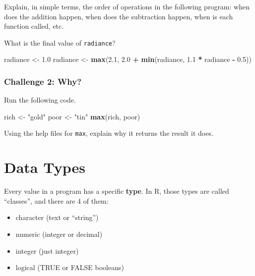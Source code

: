 \documentclass[]{book}
\newenvironment{Shaded}{\begin{snugshade}}{\end{snugshade}}
\newcommand{\FloatTok}[1]{\textcolor[rgb]{0.00,0.00,0.81}{#1}}
\newcommand{\KeywordTok}[1]{\textcolor[rgb]{0.13,0.29,0.53}{\textbf{#1}}}
\newcommand{\NormalTok}[1]{#1}
\newcommand{\OperatorTok}[1]{\textcolor[rgb]{0.81,0.36,0.00}{\textbf{#1}}}
\newcommand{\StringTok}[1]{\textcolor[rgb]{0.31,0.60,0.02}{#1}}
\providecommand{\tightlist}{%
  \setlength{\itemsep}{0pt}\setlength{\parskip}{0pt}}
\begin{document}
Explain, in simple terms, the order of operations in the following program: when does the addition happen, when does the subtraction happen, when is each function called, etc.

What is the final value of \texttt{radiance}?

\begin{Shaded}
\begin{Highlighting}[]
\NormalTok{radiance <-}\StringTok{ }\FloatTok{1.0}
\NormalTok{radiance <-}\StringTok{ }\KeywordTok{max}\NormalTok{(}\FloatTok{2.1}\NormalTok{, }\FloatTok{2.0} \OperatorTok{+}\StringTok{ }\KeywordTok{min}\NormalTok{(radiance, }\FloatTok{1.1} \OperatorTok{*}\StringTok{ }\NormalTok{radiance }\OperatorTok{-}\StringTok{ }\FloatTok{0.5}\NormalTok{))}
\end{Highlighting}
\end{Shaded}

\hypertarget{challenge-2-why}{%
\subsubsection*{Challenge 2: Why?}\label{challenge-2-why}}

Run the following code.

\begin{Shaded}
\begin{Highlighting}[]
\NormalTok{rich <-}\StringTok{ "gold"}
\NormalTok{poor <-}\StringTok{ "tin"}
\KeywordTok{max}\NormalTok{(rich, poor)}
\end{Highlighting}
\end{Shaded}

Using the help files for \texttt{max}, explain why it returns the result it does.

\hypertarget{data-types}{%
\section{Data Types}\label{data-types}}

Every value in a program has a specific \textbf{type}. In R, those types are called ``classes'', and there are 4 of them:

\begin{itemize}
\tightlist
\item
  character (text or ``string'')
\item
  numeric (integer or decimal)
\item
  integer (just integer)
\item
  logical (TRUE or FALSE booleans)
\end{itemize}
\end{document}
